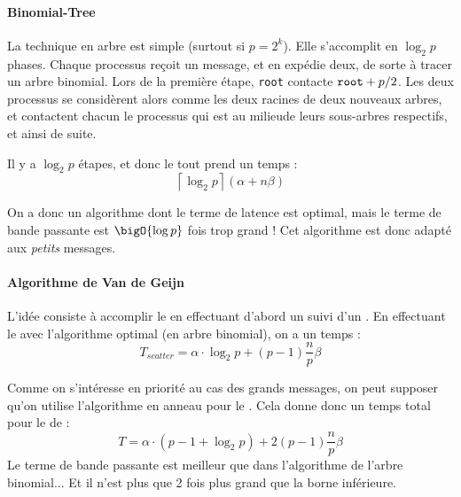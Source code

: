 
\paragraph{\og Binomial-Tree\fg} La technique en arbre est simple (surtout si
$p=2^k$). Elle s'accomplit en $\log_2 p$ phases. Chaque processus reçoit un
message, et en expédie deux, de sorte à tracer un arbre binomial. Lors de
la première étape, \verb|root| contacte $\verb|root| + p/2$. Les deux processus
se considèrent alors comme les deux racines de deux nouveaux arbres, et
contactent chacun le processus qui est \og au milieu\fg de leurs sous-arbres
respectifs, et ainsi de suite.

Il y a $\log_2 p$ étapes, et donc le tout prend un temps :
\[
\left\lceil \log_2 p \right\rceil (\alpha + n \beta)
\]

On a donc un algorithme dont le terme de latence est optimal, mais le
terme de bande passante est $\bigO{\log p}$ fois trop grand ! Cet
algorithme est donc adapté aux \emph{petits} messages.

\paragraph{Algorithme de Van de Geijn} L'idée consiste à accomplir le
 en effectuant d'abord un  suivi d'un
. En effectuant le  avec l'algorithme
optimal (en arbre binomial), on a un temps :
\[
T_{scatter} = \alpha \cdot \log_2 p + (p-1) \frac{n}{p} \beta
\]

Comme on s'intéresse en priorité au cas des grands messages, on peut
supposer qu'on utilise l'algorithme en anneau pour le
. Cela donne donc un temps total pour le
 de :
\[
T = \alpha \cdot (p-1+\log_2 p) + 2 (p-1) \frac{n}{p} \beta
\]
Le terme de bande passante est meilleur que dans l'algorithme de
l'arbre binomial... Et il n'est plus que 2 fois plus grand que la
borne inférieure.

% 





